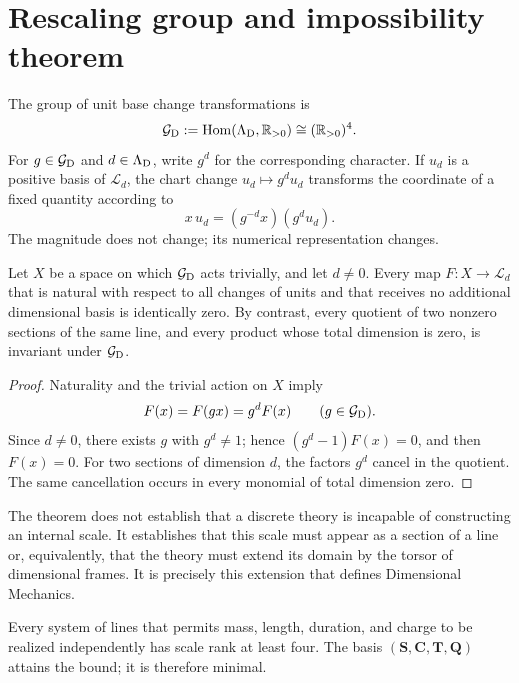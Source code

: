 \section{Rescaling group and impossibility theorem}

The group of unit base change transformations is
\[
 \mathcal G_{\rm D}
 :=\operatorname{Hom}(\Lambda_{\rm D},\mathbb R_{>0})
 \cong(\mathbb R_{>0})^4.
\]
For \(g\in\mathcal G_{\rm D}\) and \(d\in\Lambda_{\rm D}\), write
\(g^d\) for the corresponding character. If \(u_d\) is a positive basis
of \(\mathcal L_d\), the chart change
\(u_d\mapsto g^d u_d\) transforms the coordinate of a fixed quantity according to
\[
 x\,u_d=(g^{-d}x)(g^du_d).
\]
The magnitude does not change; its numerical representation changes.

\begin{theorem}
\label{thm:no-go-dimensional-rango-cuatro}
Let \(X\) be a space on which \(\mathcal G_{\rm D}\) acts
trivially, and let \(d\ne0\). Every map
\(F:X\to\mathcal L_d\) that is natural with respect to all changes of
units and that receives no additional dimensional basis is identically
zero. By contrast, every quotient of two nonzero sections of the same line,
and every product whose total dimension is zero, is invariant under
\(\mathcal G_{\rm D}\).
\end{theorem}

\begin{proof}
Naturality and the trivial action on \(X\) imply
\[
 F(x)=F(gx)=g^dF(x)
 \qquad(g\in\mathcal G_{\rm D}).
\]
Since \(d\ne0\), there exists \(g\) with \(g^d\ne1\); hence
\((g^d-1)F(x)=0\), and then \(F(x)=0\). For two sections of dimension
\(d\), the factors \(g^d\) cancel in the quotient. The same cancellation
occurs in every monomial of total dimension zero.
\end{proof}

The theorem does not establish that a discrete theory is incapable of constructing an
internal scale. It establishes that this scale must appear as a section of
a line or, equivalently, that the theory must extend its domain by the
torsor of dimensional frames. It is precisely this extension that defines
Dimensional Mechanics.

\begin{corollary}
Every system of lines that permits mass, length, duration, and charge to be realized
independently has scale rank at least four. The basis
\((\mathbf S,\mathbf C,\mathbf T,\mathbf Q)\) attains the bound; it is therefore
minimal.
\end{corollary}

